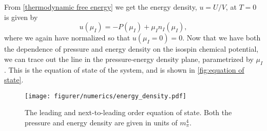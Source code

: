 From \cref{thermodynamic free energy} we get the energy density, $u = U/V$, at $T = 0$ is given by
\begin{equation}
    u(\mu_I) = -P(\mu_I) + \mu_I n_I(\mu_I),
\end{equation}
where we again have normalized so that $u(\mu_I = 0) = 0$.
Now that we have both the dependence of pressure and energy density on the isospin chemical potential, we can trace out the line in the pressure-energy density plane, parametrized by $\mu_I$.
This is the equation of state of the system, and is shown in \autoref{fig:equation of state}.


\begin{figure}[h]
    \centering
    \vspace{-0.2cm}
    \texttt{[image: figurer/numerics/energy\_density.pdf]}
    \caption{The leading and next-to-leading order equation of state. Both the pressure and energy density are given in units of $m_\pi^4$.}
    \label{fig:equation of state}
\end{figure}

\FloatBarrier

